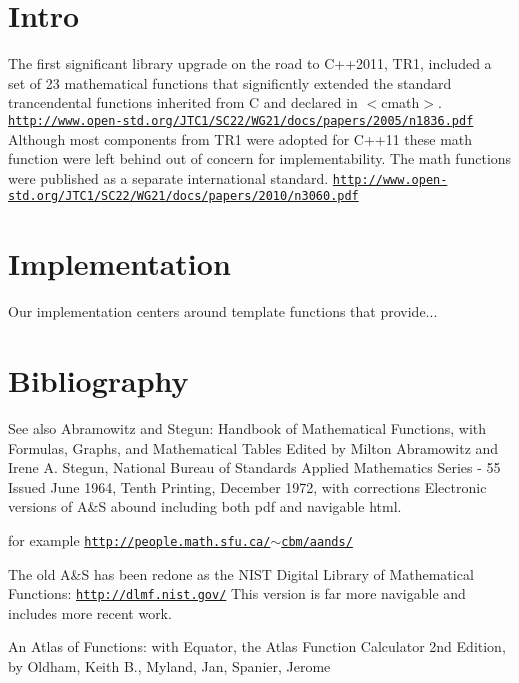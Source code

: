 \hypertarget{index_Intro}{}\section{Intro}\label{index_Intro}
The first significant library upgrade on the road to C++2011, T\+R1, included a set of 23 mathematical functions that significntly extended the standard trancendental functions inherited from C and declared in $<$cmath$>$. \href{http://www.open-std.org/JTC1/SC22/WG21/docs/papers/2005/n1836.pdf}{\tt http\+://www.\+open-\/std.\+org/\+J\+T\+C1/\+S\+C22/\+W\+G21/docs/papers/2005/n1836.\+pdf} Although most components from T\+R1 were adopted for C++11 these math function were left behind out of concern for implementability. The math functions were published as a separate international standard. \href{http://www.open-std.org/JTC1/SC22/WG21/docs/papers/2010/n3060.pdf}{\tt http\+://www.\+open-\/std.\+org/\+J\+T\+C1/\+S\+C22/\+W\+G21/docs/papers/2010/n3060.\+pdf}\hypertarget{index_Implementation}{}\section{Implementation}\label{index_Implementation}
Our implementation centers around template functions that provide...\hypertarget{index_Bibliography}{}\section{Bibliography}\label{index_Bibliography}
\begin{DoxySeeAlso}{See also}
Abramowitz and Stegun\+: Handbook of Mathematical Functions, with Formulas, Graphs, and Mathematical Tables Edited by Milton Abramowitz and Irene A. Stegun, National Bureau of Standards Applied Mathematics Series -\/ 55 Issued June 1964, Tenth Printing, December 1972, with corrections Electronic versions of A\&S abound including both pdf and navigable html. 

for example \href{http://people.math.sfu.ca/~cbm/aands/}{\tt http\+://people.\+math.\+sfu.\+ca/$\sim$cbm/aands/}

The old A\&S has been redone as the N\+I\+S\+T Digital Library of Mathematical Functions\+: \href{http://dlmf.nist.gov/}{\tt http\+://dlmf.\+nist.\+gov/} This version is far more navigable and includes more recent work.

An Atlas of Functions\+: with Equator, the Atlas Function Calculator 2nd Edition, by Oldham, Keith B., Myland, Jan, Spanier, Jerome 
\end{DoxySeeAlso}
